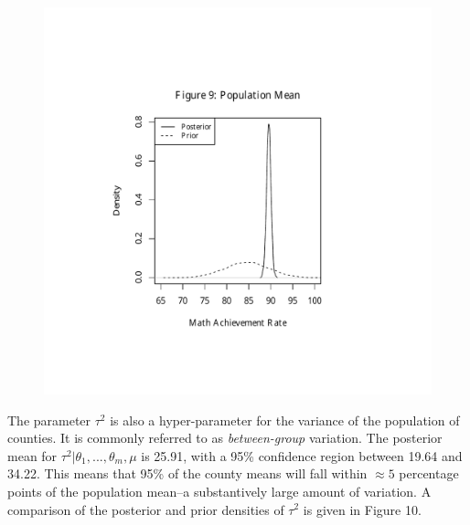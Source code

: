 \documentclass[11pt]{article}
\begin{document}
\begin{figure}[H]
\centering
    \includegraphics[trim= 0in 1in 0in 1.5in,clip,scale=0.8]{mu_post}
\end{figure}

The parameter $\tau^2$ is also a hyper-parameter for the variance of the population of counties.  It is commonly referred to as \textit{between-group} variation.  The posterior mean for $\tau^2\vert\theta_1,...,\theta_m,\mu$ is 25.91, with a 95\% confidence region between 19.64 and 34.22.  This means that 95\% of the county means will fall within $\approx 5$ percentage points of the population mean--a substantively large amount of variation.  A comparison of the posterior and prior densities of $\tau^2$ is given in Figure 10.
  
\end{document}
